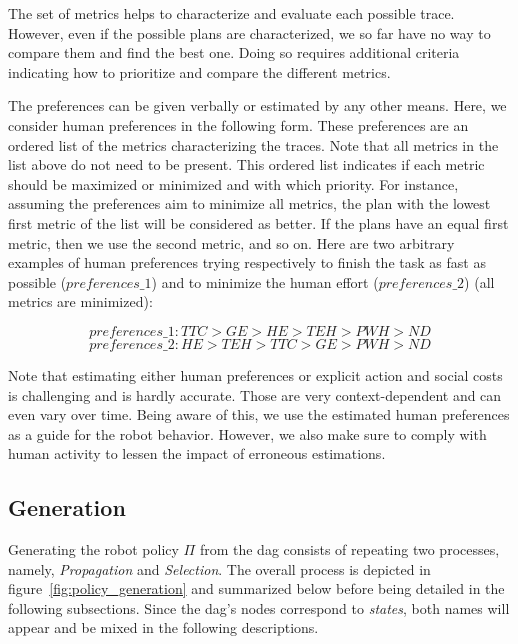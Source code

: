 The set of metrics helps to characterize and evaluate each possible trace. However, even if the possible plans are characterized, we so far have no way to compare them and find the best one. Doing so requires additional criteria indicating how to prioritize and compare the different metrics.

The preferences can be given verbally or estimated by any other means. Here, we consider human preferences in the following form. These preferences are an ordered list of the metrics characterizing the traces. Note that all metrics in the list above do not need to be present. This ordered list indicates if each metric should be maximized or minimized and with which priority. For instance, assuming the preferences aim to minimize all metrics, the plan with the lowest first metric of the list will be considered as better. If the plans have an equal first metric, then we use the second metric, and so on. Here are two arbitrary examples of human preferences trying respectively to finish the task as fast as possible ($preferences\_1$) and to minimize the human effort ($preferences\_2$) (all metrics are minimized):

\begin{equation*}
    preferences\_1: TTC > GE > HE > TEH > PWH > ND 
\end{equation*}
\begin{equation*}
    preferences\_2: HE > TEH > TTC > GE > PWH > ND 
\end{equation*}


Note that estimating either human preferences or explicit action and social costs is challenging and is hardly accurate. Those are very context-dependent and can even vary over time.
Being aware of this, we use the estimated human preferences as a guide for the robot behavior. However, we also make sure to comply with human activity to lessen the impact of erroneous estimations. 

    \subsection{Generation}

Generating the robot policy $\Pi$ from the \acrshort{dag} consists of repeating two processes, namely, \textit{Propagation} and \textit{Selection}. The overall process is depicted in figure~\ref{fig:policy_generation} and summarized below before being detailed in the following subsections. Since the \acrshort{dag}'s nodes correspond to \textit{states}, both names will appear and be mixed in the following descriptions. 

